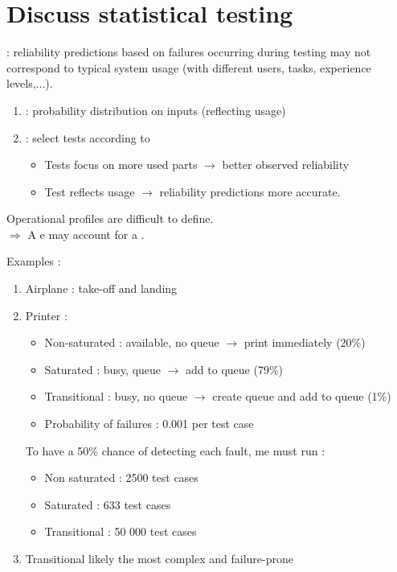 \section{Discuss statistical testing}

: reliability predictions based on failures occurring during testing may not correspond to typical system usage (with different users, tasks, experience levels,...).
\begin{enumerate}
    \item {} : probability distribution on inputs (reflecting usage)
    \item {} : select tests according to 
    \begin{itemize}
        \item Tests focus on more used parts $\rightarrow$ better observed reliability
        \item Test reflects usage $\rightarrow$ reliability predictions more accurate.
    \end{itemize}
\end{enumerate}


Operational profiles are difficult to define.\\
$\Rightarrow$ A e may account for a .

Examples :
\begin{enumerate}
    \item Airplane : take-off and landing
    \item Printer : 
    \begin{itemize}
        \item Non-saturated : available, no queue $\rightarrow$ print immediately (20\%)
        \item Saturated : busy, queue $\rightarrow$ add to queue (79\%)
        \item Transitional : busy, no queue $\rightarrow$ create queue and add to queue (1\%)
        \item Probability of failures : 0.001 per test case
    \end{itemize}
    To have a 50\% chance of detecting each fault, me must run :
    \begin{itemize}
        \item Non saturated : 2500 test cases
        \item Saturated : 633 test cases
        \item Transitional : 50 000 test cases
    \end{itemize}
    \item Transitional likely the most complex and failure-prone
\end{enumerate}
